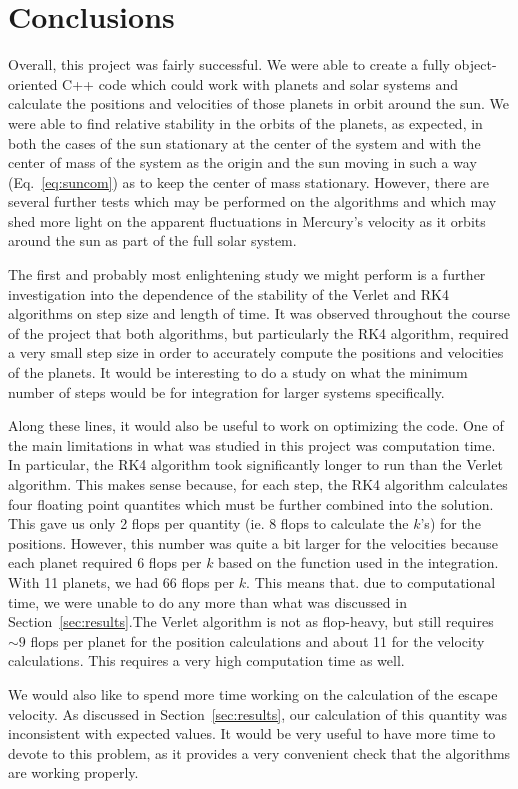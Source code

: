 \documentclass[12pt]{article}
\numberwithin{equation}{section}
\begin{document}
\section{Conclusions}
\label{sec:conclusions}

Overall, this project was fairly successful.  We were able to create a fully object-oriented C++ code which could work with planets and solar systems and calculate the positions and velocities of those planets in orbit around the sun.  We were able to find relative stability in the orbits of the planets, as expected, in both the cases of the sun stationary at the center of the system and with the center of mass of the system as the origin and the sun moving in such a way (Eq.~\ref{eq:suncom}) as to keep the center of mass stationary.  However, there are several further tests which may be performed on the algorithms and which may shed more light on the apparent fluctuations in Mercury's velocity as it orbits around the sun as part of the full solar system.
\par The first and probably most enlightening study we might perform is a further investigation into the dependence of the stability of the Verlet and RK4 algorithms on step size and length of time.  It was observed throughout the course of the project that both algorithms, but particularly the RK4 algorithm, required a very small step size in order to accurately compute the positions and velocities of the planets.  It would be interesting to do a study on what the minimum number of steps would be for integration for larger systems specifically.  
\par Along these lines, it would also be useful to work on optimizing the code.  One of the main limitations in what was studied in this project was computation time.  In particular, the RK4 algorithm took significantly longer to run than the Verlet algorithm.  This makes sense because, for each step, the RK4 algorithm calculates four floating point quantites which must be further combined into the solution.  This gave us only 2 flops per quantity (ie. 8 flops to calculate the $k$'s) for the positions.  However, this number was quite a bit larger for the velocities because each planet required 6 flops per $k$ based on the function used in the integration.  With 11 planets, we had 66 flops per $k$.  This means that. due to computational time, we were unable to do any more than what was discussed in Section~\ref{sec:results}.The Verlet algorithm is not as flop-heavy, but still requires $\sim9$ flops per planet for the position calculations and about 11 for the velocity calculations.  This requires a very high computation time as well.
\par We would also like to spend more time working on the calculation of the escape velocity.  As discussed in Section~\ref{sec:results}, our calculation of this quantity was inconsistent with expected values.  It would be very useful to have more time to devote to this problem, as it provides a very convenient check that the algorithms are working properly.
\end{document}
